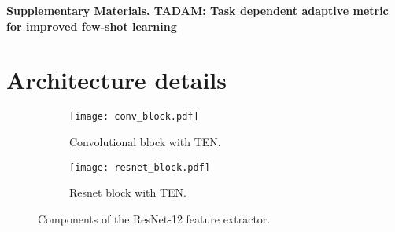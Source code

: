 \documentclass{article}
\begin{document}
    



\newpage
\pagebreak
\begin{center}
\textbf{\large Supplementary Materials. TADAM: Task dependent adaptive metric for improved few-shot learning}
\end{center}
\setcounter{equation}{0}
\setcounter{figure}{0}
\setcounter{table}{0}
\setcounter{page}{1}
\setcounter{section}{0}
\makeatletter
\gdef\thesection{S\@arabic\c@section}


\section{Architecture details} \label{ssec:components_of_architecture}

\begin{figure}[h]
    \centering
    \begin{subfigure}[t]{0.35\textwidth}
        \centering
        \texttt{[image: conv\_block.pdf]}
        \caption{Convolutional block with TEN.}
        \label{fig:conv_block}
    \end{subfigure} \hspace{0.15\textwidth}
    \begin{subfigure}[t]{0.3\textwidth}
        \centering
        \texttt{[image: resnet\_block.pdf]}
        \caption{Resnet block with TEN.}
        \label{fig:resnet_block}
    \end{subfigure}
    \caption{Components of the ResNet-12 feature extractor.}
    \label{fig:ten_resnet_details}
\end{figure}
\end{document}
